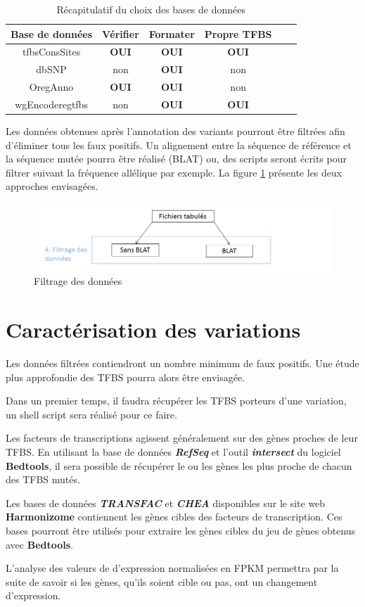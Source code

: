 \begin{table}[h]
\centering
\begin{tabular}{|c|c|c|c|c|c|}
\hline
Base de données & Vérifier & Formater & Propre TFBS\\
\hline
tfbsConsSites & \textbf{OUI} & \textbf{OUI} & \textbf{OUI}\\
\hline
dbSNP & non & \textbf{OUI} & non\\
\hline
OregAnno & \textbf{OUI} & \textbf{OUI} & non\\
\hline
wgEncoderegtfbs & non & \textbf{OUI} & \textbf{OUI}\\
\hline
\end{tabular}
\caption{Récapitulatif du choix des bases de données}
\end{table}

Les données obtenues après l'annotation des variants pourront être filtrées afin d'éliminer tous les \gls{faux positifs}. Un alignement entre la séquence de référence et la séquence mutée pourra être réalisé (BLAT) ou, des scripts seront écrits pour filtrer suivant la fréquence allélique par exemple. La figure \ref{fig:part4} présente les deux approches envisagées. 

\begin{figure}[h]
\centering
\includegraphics[scale = 0.6]{Figures/partie4.png}
\caption{Filtrage des données}
\label{fig:part4}
\end{figure}

\section{Caractérisation des variations}

Les données filtrées contiendront un nombre minimum de \og faux positifs\fg. Une étude plus approfondie des TFBS pourra alors être envisagée.

Dans un premier temps, il faudra récupérer les TFBS porteurs d'une variation, un shell script sera réalisé pour ce faire.

Les facteurs de transcriptions agissent généralement sur des gènes proches de leur TFBS. En utilisant la base de données \textit{\textbf{RefSeq}} et l'outil \textit{\textbf{intersect}} du logiciel \textbf{Bedtools}, il sera possible de récupérer le ou les gènes les plus proche de chacun des TFBS mutés. 

Les bases de données \textit{\textbf{TRANSFAC}} et \textit{\textbf{CHEA}} disponibles sur le site web \textbf{Harmonizome} \citep{harmonizome} contiennent les gènes cibles des facteurs de transcription. Ces bases pourront être utilisés pour extraire les gènes cibles du jeu de gènes obtenus avec \textbf{Bedtools}.

L'analyse des valeurs de d'expression normalisées en FPKM permettra par la suite de savoir si les gènes, qu'ils soient cible ou pas, ont un changement d'expression. 
 


